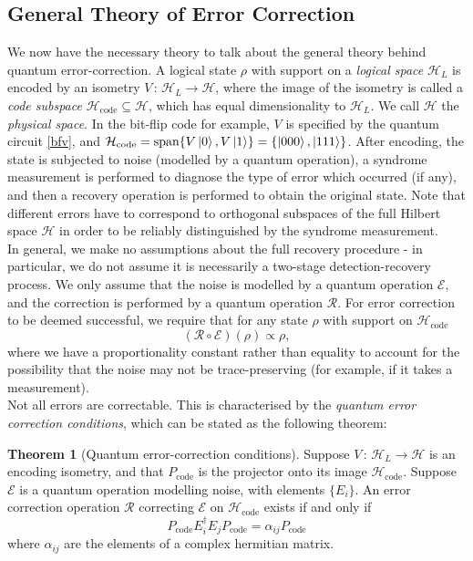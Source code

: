 \documentclass[12pt,a4paper]{report}
\numberwithin{equation}{section}
\newcommand{\Pc}{P_{\text{code}}}
\newcommand{\Hcode}{\mathcal{H}_{\text{code}}}
\theoremstyle{definition}
\theoremstyle{theorem}
\newtheorem{theorem}{Theorem}[section]
\theoremstyle{theorem}
\theoremstyle{example}
\theoremstyle{definition}
\begin{document}
\subsection{General Theory of Error Correction}
We now have the necessary theory to talk about the general theory behind quantum error-correction. A logical state $\rho$ with support on a \textit{logical space} $\mathcal{H}_{L}$ is encoded by an isometry $V\,:\,\mathcal{H}_{L}\to\mathcal{H}$, where the image of the isometry is called a \textit{code subspace} $\Hcode\subseteq\mathcal{H}$, which has equal dimensionality to $\mathcal{H}_{L}$. We call $\mathcal{H}$ the \textit{physical space}. In the bit-flip code for example, $V$ is specified by the quantum circuit \ref{bfv}, and  $\Hcode=\text{span}\{V\ket{0},V\ket{1}\}=\{\ket{000},\ket{111}\}$. After encoding, the state is subjected to noise (modelled by a quantum operation), a syndrome measurement is performed to diagnose the type of error which occurred (if any), and then a recovery operation is performed to obtain the original state. Note that different errors have to correspond to orthogonal subspaces of the full Hilbert space $\mathcal{H}$ in order to be reliably distinguished by the syndrome measurement.\\
In general, we make no assumptions about the full recovery procedure - in particular, we do not assume it is necessarily a two-stage detection-recovery process. We only assume that the noise is modelled by a quantum operation $\mathcal{E}$, and the correction is performed by a quantum operation $\mathcal{R}$. For error correction to be deemed successful, we require that for any state $\rho$ with support on $\Hcode$
\begin{equation}
	(\mathcal{R}\circ\mathcal{E})(\rho)\propto\rho,
\end{equation}
where we have a proportionality constant rather than equality to account for the possibility that the noise may not be trace-preserving (for example, if it takes a measurement).\\
Not all errors are correctable. This is characterised by the \textit{quantum error correction conditions}, which can be stated as the following theorem:
\begin{theorem}[Quantum error-correction conditions]\label{QECC}
	Suppose $V\,:\,\mathcal{H}_{L}\to\mathcal{H}$ is an encoding isometry, and that $\Pc$ is the projector onto its image $\Hcode$. Suppose $\mathcal{E}$ is a quantum operation modelling noise, with elements $\{E_{i}\}$. An error correction operation $\mathcal{R}$ correcting $\mathcal{E}$ on $\Hcode$ exists if and only if
	\begin{equation}\label{QECC1}
		\Pc E_{i}^{\dagger}E_{j}\Pc=\alpha_{ij}\Pc
	\end{equation}
	where $\alpha_{ij}$ are the elements of a complex hermitian matrix.
\end{theorem}
\end{document}
